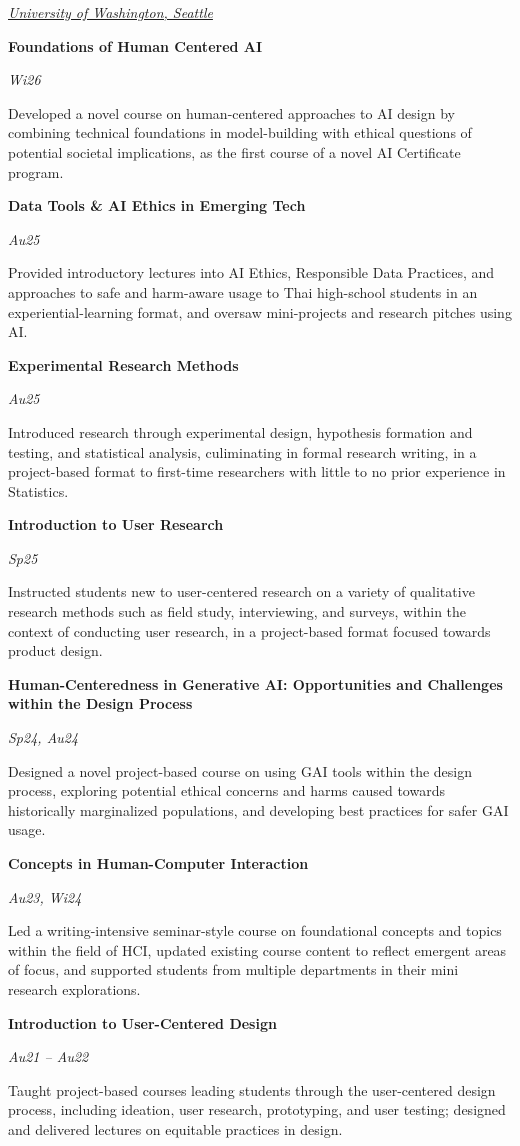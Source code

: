 \documentclass[10pt, letterpaper]{article}
\newcommand{\uwexpentry}[3]{%
  \noindent
  \begin{minipage}[t]{0.80\linewidth}
    \textbf{#1}
  \end{minipage}%
  \hfill
  \begin{minipage}[t]{0.18\linewidth}\raggedleft
    \textcolor{uwpurple}{\textit{#2}}
  \end{minipage}\par\vspace{2pt}
  \noindent
  \begin{minipage}[t]{0.85\linewidth} #3 \end{minipage}\par
  \vspace{5pt}
}
\begin{document}
\noindent\underline{\large \textcolor{uwpurple}{\textit{University of Washington, Seattle}}}\vspace{3pt}

\uwexpentry{Foundations of Human Centered AI}{Wi26}
  {Developed a novel course on human-centered approaches to AI design by combining technical foundations in model-building with ethical questions of potential societal implications, as the first course of a novel AI Certificate program. 
}

\uwexpentry{Data Tools \& AI Ethics in Emerging Tech}{Au25}
  {Provided introductory lectures into AI Ethics, Responsible Data Practices, and \\ approaches to safe and harm-aware usage to Thai high-school students in an experiential-learning format, and oversaw mini-projects and research pitches using AI. 
}

\uwexpentry{Experimental Research Methods}{Au25}
  {Introduced research through experimental design, hypothesis formation and testing, and statistical analysis, culiminating in formal research writing, in a project-based format to first-time researchers with little to no prior experience in Statistics. 
}

\uwexpentry{Introduction to User Research}{Sp25}
  {Instructed students new to user-centered research on a variety of qualitative research methods such as field study, interviewing, and surveys, within the context of conducting user research, in a project-based format focused towards product design.
}

\uwexpentry{Human-Centeredness in Generative AI: Opportunities and Challenges \newline within the Design Process}{Sp24, Au24}
  {Designed a novel project-based course on using GAI tools within the design process, exploring potential ethical concerns and harms caused towards historically marginalized populations, and developing best practices for safer GAI usage. 
}

\uwexpentry{Concepts in Human-Computer Interaction}{Au23, Wi24}
  {Led a writing-intensive seminar-style course on foundational concepts and topics within the field of HCI, updated existing course content to reflect emergent areas of focus, and supported students from multiple departments in their mini research explorations.
}

\uwexpentry{Introduction to User-Centered Design}{Au21 -- Au22}
  {Taught project-based courses leading students through the user-centered design process, including ideation, user research, prototyping, and user testing; designed and delivered lectures on equitable practices in design.}
\end{document}
